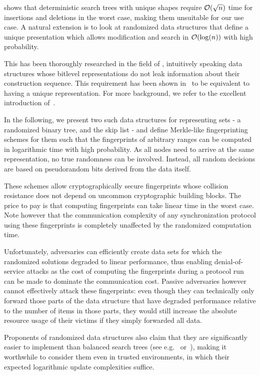 \cite{uniquerepresentation} shows that deterministic search trees with unique shapes require $\mathcal{O}(\sqrt{n})$ time for insertions and deletions in the worst case, making them unsuitable for our use case. A natural extension is to look at randomized data structures that define a unique presentation which allows modification and search in $\mathcal{O}(\log(n))$ with high probability.

This has been thoroughly researched in the field of , intuitively speaking data structures whose bitlevel representations do not leak information about their construction sequence. This requirement has been shown in~\cite{hartline2005characterizing} to be equivalent to having a unique representation. For more background, we refer to the excellent introduction of~\cite{bender2016anti}.

In the following, we present two such data structures for representing sets - a randomized binary tree, and the skip list - and define Merkle-like fingerprinting schemes for them such that the fingerprints of arbitrary ranges can be computed in logarithmic time with high probability. As all nodes need to arrive at the same representation, no true randomness can be involved. Instead, all random decisions are based on pseudorandom bits derived from the data itself.

These schemes allow cryptographically secure fingerprints whose collision resistance does not depend on uncommon cryptographic building blocks. The price to pay is that computing fingerprints can take linear time in the worst case. Note however that the communication complexity of any synchronization protocol using these fingerprints is completely unaffected by the randomized computation time.

Unfortunately, adversaries can efficiently create data sets for which the randomized solutions degraded to linear performance, thus enabling denial-of-service attacks as the cost of computing the fingerprints during a protocol run can be made to dominate the communication cost. Passive adversaries however cannot effectively attack these fingerprints: even though they can technically only forward those parts of the data structure that have degraded performance relative to the number of items in those parts, they would still increase the absolute resource usage of their victims if they simply forwarded all data.

Proponents of randomized data structures also claim that they are significantly easier to implement than balanced search trees (see e.g.~\cite{seidel1996randomized} or~\cite{pugh1990skip}), making it worthwhile to consider them even in trusted environments, in which their expected logarithmic update complexities suffice.

